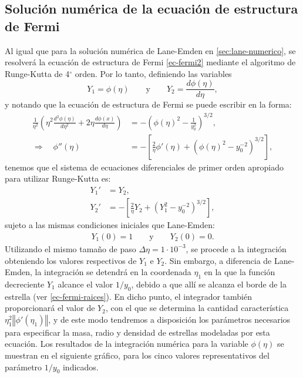 \subsection{Solución numérica de la ecuación de estructura de Fermi}\label{sec:fermi-numerico}
Al igual que para la solución numérica de Lane-Emden en \ref{sec:lane-numerico}, se resolverá la ecuación de estructura de Fermi \eqref{ec-fermi2} mediante el algoritmo de Runge-Kutta de 4${}^{\circ}$ orden. Por lo tanto, definiendo las variables
\begin{equation}
 Y_1=\phi(\eta)\qquad\text{y}\qquad Y_2=\frac{d\phi(\eta)}{d\eta},
\end{equation}
y notando que la ecuación de estructura de Fermi se puede escribir en la forma:
\begin{align}
\frac{1}{\eta^2}\left(\eta^2\frac{d^2\phi(\eta)}{d\eta^2}+2\eta
\frac{d\phi(x)}{d\eta}\right)&=-\left(\phi(\eta)^2-\frac{1}{y_0^2}\right)^{3/2},\\
\Rightarrow\quad \phi''(\eta)&=-\left[\frac{2}{\eta}\phi'(\eta)+\left(\phi(\eta)^2-y_0^{-2}\right)^{3/2}\right],\label{ec-fermi-phi''}
\end{align}
tenemos que el sistema de ecuaciones diferenciales de primer orden apropiado para utilizar Runge-Kutta es:
\begin{equation}
\boxed{
\begin{aligned}
 Y_1'&=Y_2,\\
Y_2'&=-\left[\frac{2}{\eta}Y_2+\left(Y_1^2-y_0^{-2}\right)^{3/2}\right],
\end{aligned}}
\end{equation}
sujeto a las mismas condiciones iniciales que Lane-Emden:
\begin{align}
 Y_1(0)=1\qquad\text{y}\qquad Y_2(0)=0.
\end{align}
Utilizando el mismo tamaño de paso $\Delta\eta=1\cdot 10^{-3}$, se procede a la integración obteniendo los valores respectivos de $Y_1$ e $Y_2$. Sin embargo, a diferencia de Lane-Emden, la integración se detendrá en la coordenada $\eta_1$ en la que la función decreciente $Y_1$ alcance el valor $1/y_0$, debido a que allí se alcanza el borde de la estrella (ver \eqref{ec-fermi-raices}). En dicho punto, el integrador también proporcionará el valor de $Y_2$, con el que se determina la cantidad característica $\eta_1^2\left\Vert\phi'(\eta_1)\right\Vert$, y de este modo tendremos a disposición los parámetros necesarios para especificar la masa, radio y densidad de estrellas modeladas por esta ecuación. Los resultados de la integración numérica para la variable $\phi(\eta)$ se muestran en el siguiente gráfico, para los cinco valores representativos del parámetro $1/y_0$ indicados.

